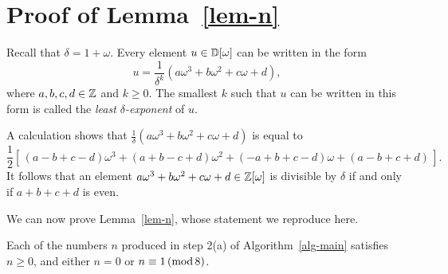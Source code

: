 \section[Proof of Lemma 8.4]{Proof of Lemma~\ref{lem-n}}
\label{appendix-n}

\begin{definition}
  Recall that $\delta=1+\omega$.
  Every element $u\in{\mathbb{D}}[\omega]$ can be written in the form
  \begin{equation}\label{eqn-delta-exponent}
    u = \frac{1}{\delta^k} (a\omega^3+b\omega^2+c\omega+d),
  \end{equation}
  where $a,b,c,d\in\mathbb{Z}$ and $k\geq 0$.
  The smallest $k$ such that $u$ can be written in this form is called
  the {\em least $\delta$-exponent} of $u$.
\end{definition}

\begin{remark}\label{rem-delta-exp}
  A calculation shows that
  $\frac{1}{\delta}(a\omega^3+b\omega^2+c\omega+d)$ is equal to
  \[ \frac12\left[\,(a-b+c-d)\omega^3 
    + (a+b-c+d)\omega^2 
    + (-a+b+c-d)\omega 
    + (a-b+c+d)\,\right].
  \]
  It follows that an element
  $a\omega^3+b\omega^2+c\omega+d\in\mathbb{Z}[\omega]$ is divisible by
  $\delta$ if and only if $a+b+c+d$ is even.
\end{remark}

We can now prove Lemma~\ref{lem-n}, whose statement we 
reproduce here.

\begin{un-lemma}
  Each of the numbers $n$ produced in step 2(a) of
  Algorithm~\ref{alg-main} satisfies $n\geq 0$, and either $n=0$ or
  $n\equiv1\,(\mathop{{\rm mod}}8)$.
\end{un-lemma}

